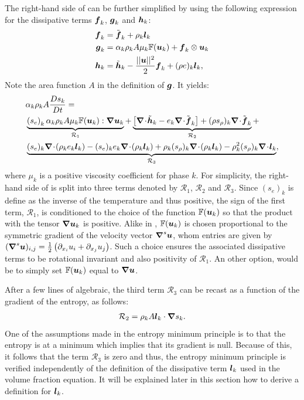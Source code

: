 The right-hand side of  can be further simplified by using the following expression
for the dissipative terms $\boldsymbol f_k$,  $\boldsymbol g_k$ and $\boldsymbol h_k$:
\begin{align}\label{eq:def-diss-terms-sect4}
  \boldsymbol f_k &= \tilde{\boldsymbol f}_k + \rho_k \boldsymbol l_k 
  \\
  \boldsymbol g_k &= \alpha_k \rho_k A \mu_k \mathbb{F}(\boldsymbol u_k) + \boldsymbol f_k \otimes \boldsymbol u_k
  \\
  \boldsymbol h_k &= \tilde{\boldsymbol h}_k - \frac{|| \boldsymbol u||^2 }{2} \boldsymbol f_k + (\rho e)_k \boldsymbol l_k,
\end{align}
Note the area function $A$ in the definition of $\boldsymbol g$. It yields:
%
\begin{align}\label{eq:ent-res-7-eqn-diss-terms2}
&\alpha_k \rho_k A \frac{Ds_k}{Dt} = \nonumber \\
&\underbrace{\left(s_e\right)_k \alpha_k \rho_k A \mu_k \mathbb{F}(\mbold u_k) : \grad \mbold u_k}_{\mathcal{R}_1} +
\underbrace{\left[ \div \tilde{\mbold h}_k  - e_k \div \tilde{\mbold f}_k  \right] + (\rho s_\rho)_k \div \tilde{\mbold f}_k}_{\mathcal{R}_2} + \nonumber \\
&\underbrace{(s_e)_k \div \left( \rho_k e_k \mbold l_k \right) -  (s_e)_k e_k \div \left( \rho_k \mbold l_k \right) + \rho_k (s_\rho)_k \div \left( \rho_k \mbold l_k \right) 
  - \rho_k^2 (s_\rho)_k \div \mbold l_k}_{\mathcal{R}_3},
\end{align}
%
where $\mu_k$ is a positive viscosity coefficient for phase $k$. For simplicity, the right-hand side of  is split into three terms denoted by $\mathcal{R}_1$, $\mathcal{R}_2$ and $\mathcal{R}_3$. Since $(s_e)_k$ is define as the inverse of the temperature and thus positive, the sign of the first term, $\mathcal{R}_1$, is conditioned to the choice of the function $\mathbb{F}(\boldsymbol u_k)$ so that the product with the tensor $\boldsymbol{\nabla} \boldsymbol u_k$ is positive. Alike in \cite{jlg}, $\mathbb{F}(\boldsymbol u_k)$ is chosen proportional to the symmetric gradient of the velocity vector $\boldsymbol{\nabla}^s \boldsymbol u$, whom entries are given by $(\boldsymbol{\nabla}^s \boldsymbol u)_{i,j} = \frac{1}{2} \left( \partial_{x_i} u_i + \partial_{x_j} u_j \right)$. Such a choice ensures the associated dissipative terms to be rotational invariant and also positivity of $\mathcal{R}_1$. An other option, would be to simply set $\mathbb{F}(\boldsymbol u_k)$ equal to $\boldsymbol{\nabla} \boldsymbol u$. 

After a few lines of algebraic, the third term ${\mathcal{R}_3}$ can be recast as a function of the gradient of the entropy, as follows:
\begin{align}
 \label{eq:ent-R3-sct4}
  \mathcal{R}_2  =  \rho_k A \boldsymbol l_k \cdot \boldsymbol{\nabla} s_k.
\end{align} 
One of the assumptions made in the entropy minimum principle is to that the entropy 
is at a minimum which implies that its gradient is null. Because of this, it follows that
the term $\mathcal{R}_3$ is zero and thus, the entropy minimum principle is verified
independently of the definition of the dissipative term $\boldsymbol l_k$ used in the volume fraction
equation. It will be explained later in this section how to derive a definition for $\boldsymbol l_k$.

